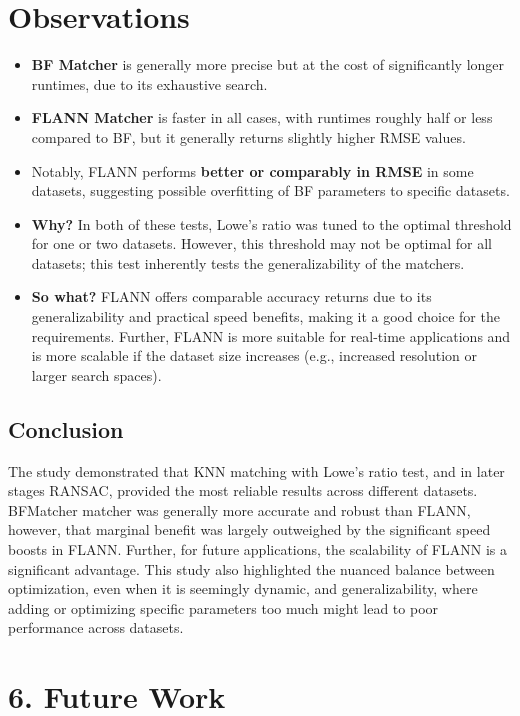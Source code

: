     \section*{Observations}
\begin{itemize}
    \item \textbf{BF Matcher} is generally more precise but at the cost of significantly longer runtimes, due to its exhaustive search.
    \item \textbf{FLANN Matcher} is faster in all cases, with runtimes roughly half or less compared to BF, but it generally returns slightly higher RMSE values.
    \item Notably, FLANN performs \textbf{better or comparably in RMSE} in some datasets, suggesting possible overfitting of BF parameters to specific datasets.
    \item \textbf{Why?} In both of these tests, Lowe's ratio was tuned to the optimal threshold for one or two datasets. However, this threshold may not be optimal for all datasets; this test inherently tests the generalizability of the matchers.
    \item \textbf{So what?} FLANN offers comparable accuracy returns due to its generalizability and practical speed benefits, making it a good choice for the requirements. Further, FLANN is more suitable for real-time applications and is more scalable if the dataset size increases (e.g., increased resolution or larger search spaces). 
\end{itemize}

\subsection*{Conclusion}

The study demonstrated that KNN matching with Lowe's ratio test, and in later stages RANSAC, provided the most reliable results across different datasets. BFMatcher matcher was generally more accurate and robust than FLANN, however, that marginal benefit was largely outweighed by the significant speed boosts in FLANN. Further, for future applications, the scalability of FLANN is a significant advantage. 
This study also highlighted the nuanced balance between optimization, even when it is seemingly dynamic, and generalizability, where adding or optimizing specific parameters too much might lead to poor performance across datasets. 


\section*{6. Future Work}

